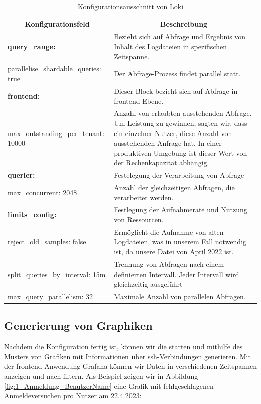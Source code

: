 \begin{table}[H]
  \begin{tabularx}{\textwidth}{|m{6cm}|X|}
  \hline
  \multicolumn{1}{|c|}{\textbf{Konfigurationsfeld}} & \multicolumn{1}{|c|}{\textbf{Beschreibung}} \\
  \hline
  \textbf{query\_range:} & Bezieht sich auf Abfrage und Ergebnis von Inhalt des Logdateien in spezifischen Zeitspanne. \\
  \hphantom{te}parallelise\_shardable\_queries: true & Der Abfrage-Prozess findet parallel statt.\\ \hline

  \textbf{frontend:} & Dieser Block bezieht sich auf Abfrage in \gls{frontend}-Ebene. \\
  \hphantom{te}max\_outstanding\_per\_tenant: 10000 & Anzahl von erlaubten  ausstehenden Abfrage. Um Leistung zu gewinnen, sagten wir, dass ein einzelner Nutzer, diese Anzahl von ausstehenden Anfrage hat. In einer produktiven Umgebung ist dieser Wert von der Rechenkapazität abhängig.\\ \hline

  \textbf{querier:} & Festelegung der Verarbeitung von Abfrage \\ 
  \hphantom{te}max\_concurrent: 2048 & Anzahl der gleichzeitigen Abfragen, die verarbeitet werden. \\ \hline

  \textbf{limits\_config:} & Festlegung der Aufnahmerate und Nutzung von Ressourcen. \\ 
  \hphantom{te}reject\_old\_samples: false & Ermöglicht die Aufnahme von alten Logdateien, was in unserem Fall notwendig ist, da unsere Datei von April 2022 ist. \\ 
  \hphantom{te}split\_queries\_by\_interval: 15m & Trennung von Abfragen nach einem definierten Intervall. Jeder Intervall wird gleichzeitig ausgeführt \\ 
  \hphantom{te}max\_query\_parallelism: 32 & Maximale Anzahl von parallelen Abfragen.  \\ \hline

  \end{tabularx}
  \caption[Konfigurationsausschnitt von Loki]
  {Konfigurationsausschnitt von Loki}
  \label{tab:KonfigLoki}
\end{table}

\subsection{Generierung von Graphiken}
Nachdem die Konfiguration fertig ist, können wir die  starten und mithilfe des Musters von \cite{VoidQuark_sshlogs} Grafiken mit Informationen über \gls{ssh}-Verbindungen generieren. Mit der \gls{frontend}-Anwendung Grafana können wir Daten in verschiedenen Zeitspannen anzeigen und nach  filtern. Als Beispiel zeigen wir in Abbildung \ref{fig:1_Anmeldung_BenutzerName} eine Grafik mit fehlgeschlagenen Anmeldeversuchen pro Nutzer am 22.4.2023:

